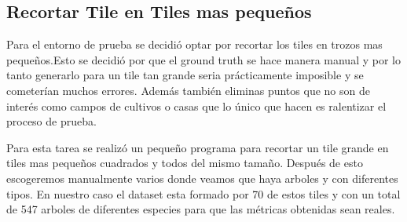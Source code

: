 \subsection{Recortar Tile en Tiles mas pequeños}
Para el entorno de prueba se decidió optar por recortar los tiles en trozos mas pequeños.Esto se decidió por que el ground truth se hace manera manual y por lo tanto generarlo para un tile tan grande seria prácticamente imposible y se cometerían muchos errores. Además también eliminas puntos que no son de interés como campos de cultivos o casas que lo único que hacen es ralentizar el proceso de prueba.

Para esta tarea se realizó un pequeño programa para recortar un tile grande en tiles mas pequeños cuadrados y todos del mismo tamaño. Después de esto escogeremos manualmente varios donde veamos que haya arboles y con diferentes tipos. En nuestro caso el dataset esta formado por 70 de estos tiles y con un total de 547 arboles de diferentes especies para que las métricas obtenidas sean reales.

